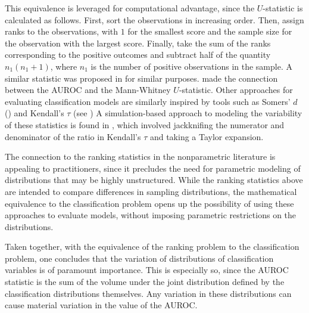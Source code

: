 This equivalence is leveraged for computational advantage, since the $U$-statistic is calculated as follows.
First, sort the observations in increasing order.
Then, assign ranks to the observations, with $1$ for the smallest score and the sample size for the observation with the largest score.
Finally, take the sum of the ranks corresponding to the positive outcomes and subtract 
half of the quantity $n_1(n_1 + 1)$, 
%
\noindent where $n_1$ is the number of positive observations in the sample.
%
A similar statistic was proposed in \citet{wilcoxon1945} for similar purposes.
\citet{bamber1975} made the connection between the AUROC and the Mann-Whitney $U$-statistic.
Other approaches for evaluating classification models are similarly inspired by tools such as
Somers' $d$ (\citet{somers1962}) and Kendall's $\tau$ (see \citet{kendall1990})
A simulation-based approach to modeling the variability of these statistics is found in \citet{newson2006}, which involved jackknifing the numerator and denominator of the ratio in Kendall's $\tau$ and taking a Taylor expansion.

The connection to the ranking statistics in the nonparametric literature is appealing to practitioners, since it precludes the need for parametric modeling of distributions that may be highly unstructured.
While the ranking statistics above are intended to compare differences in sampling distributions, the mathematical equivalence to the classification problem opens up the possibility of using these approaches to evaluate models, without imposing parametric restrictions on the distributions.


Taken together, with the equivalence of the ranking problem to the classification problem,
%
one concludes that the variation of distributions of classification variables is of paramount importance.
This is especially so, since the AUROC statistic is the sum of the volume under the joint distribution defined by the classification distributions themselves.
Any variation in these distributions can cause material variation in the value of the AUROC.



